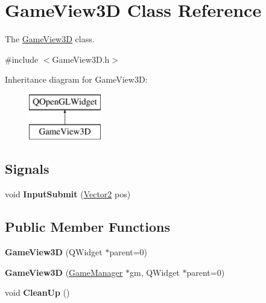 \hypertarget{classGameView3D}{\section{Game\-View3\-D Class Reference}
\label{classGameView3D}
}


The \hyperlink{classGameView3D}{Game\-View3\-D} class.  




{\ttfamily \#include $<$Game\-View3\-D.\-h$>$}

Inheritance diagram for Game\-View3\-D\-:\begin{figure}[H]
\begin{center}
\leavevmode
\includegraphics[height=2.000000cm]{classGameView3D}
\end{center}
\end{figure}
\subsection*{Signals}
\begin{DoxyCompactItemize}
\item 
\hypertarget{classGameView3D_ada434861732fe261a9a7958de4fb5f2e}{void {\bfseries Input\-Submit} (\hyperlink{structVector2}{Vector2} pos)}\label{classGameView3D_ada434861732fe261a9a7958de4fb5f2e}

\end{DoxyCompactItemize}
\subsection*{Public Member Functions}
\begin{DoxyCompactItemize}
\item 
\hypertarget{classGameView3D_aa2a60cd38325c7a4ec92909d2efe7a80}{{\bfseries Game\-View3\-D} (Q\-Widget $\ast$parent=0)}\label{classGameView3D_aa2a60cd38325c7a4ec92909d2efe7a80}

\item 
\hypertarget{classGameView3D_a447292a1846348584fea8cbd2392d1dd}{{\bfseries Game\-View3\-D} (\hyperlink{classGameManager}{Game\-Manager} $\ast$gm, Q\-Widget $\ast$parent=0)}\label{classGameView3D_a447292a1846348584fea8cbd2392d1dd}

\item 
\hypertarget{classGameView3D_a9662a858540b5fcc1a80d78cd0a0aa2a}{void {\bfseries Clean\-Up} ()}\label{classGameView3D_a9662a858540b5fcc1a80d78cd0a0aa2a}

\end{DoxyCompactItemize}
